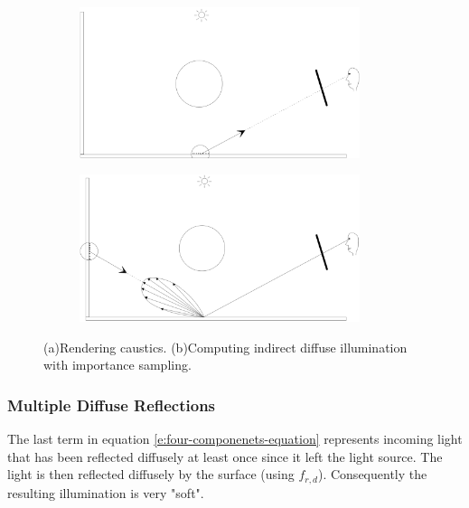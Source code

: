 \begin{figure}\label{f:photon-rendering}
\begin{center}
	\begin{subfigure}[b]{0.48\textwidth}
		\includegraphics[width=0.9\textwidth]{graphics/pm/pm-10-1}
	\end{subfigure}
	\begin{subfigure}[b]{0.48\textwidth}
		\includegraphics[width=0.9\textwidth]{graphics/pm/pm-10-2}
	\end{subfigure}
\end{center}
\caption{(a)Rendering caustics. (b)Computing indirect diffuse illumination with importance sampling.}
\end{figure}



\subsubsection{Multiple Diffuse Reflections}
The last term in equation \ref{e:four-componenets-equation} represents incoming light that has been reflected diffusely at least once since it left the light source. The light is then reflected diffusely by the surface (using $f_{r,d}$). Consequently the resulting illumination is very "soft".

